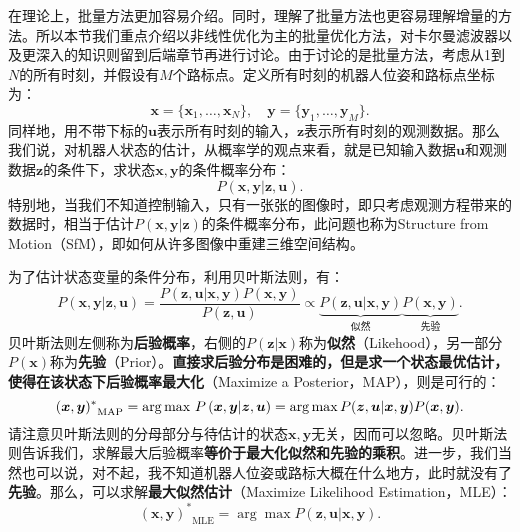 在理论上，批量方法更加容易介绍。同时，理解了批量方法也更容易理解增量的方法。所以本节我们重点介绍以非线性优化为主的批量优化方法，对卡尔曼滤波器以及更深入的知识则留到后端章节再进行讨论。由于讨论的是批量方法，考虑从1到$N$的所有时刻，并假设有$M$个路标点。定义所有时刻的机器人位姿和路标点坐标为：
\[
\bm{x}=\{ \bm{x}_1, \ldots, \bm{x}_N \}, \quad \bm{y} = \{\bm{y}_1, \ldots, \bm{y}_M \}.
\]
同样地，用不带下标的$\bm{u}$表示所有时刻的输入，$\bm{z}$表示所有时刻的观测数据。那么我们说，对机器人状态的估计，从概率学的观点来看，就是已知输入数据$\bm{u}$和观测数据$\bm{z}$的条件下，求状态$\bm{x},\bm{y}$的条件概率分布：
\begin{equation}
P( \bm{x},\bm{y} | \bm{z}, \bm{u}).
\end{equation}
特别地，当我们不知道控制输入，只有一张张的图像时，即只考虑观测方程带来的数据时，相当于估计$P( \bm{x},\bm{y} | \bm{z} )$的条件概率分布，此问题也称为Structure from Motion（SfM），即如何从许多图像中重建三维空间结构\textsuperscript{\cite{Agarwal2009}}。

为了估计状态变量的条件分布，利用贝叶斯法则，有：
\begin{equation}
P\left( { \bm{x},\bm{y}| \bm{z}, \bm{u}} \right) = \frac{{P\left( {\bm{z},\bm{u}|\bm{x},\bm{y}} \right)P\left( \bm{x}, \bm{y} \right)}}{{P\left( \bm{z},\bm{u}\right)}} \propto \underbrace{P\left(  { \bm{z},\bm{u}| \bm{x},\bm{y} } \right)}_{\text{似然}} \underbrace{P\left( \bm{x},\bm{y} \right)}_{\text{先验}}.
\end{equation}
贝叶斯法则左侧称为\textbf{后验概率}，右侧的$P(\bm{z}|\bm{x})$称为\textbf{似然}（Likehood），另一部分$P(\bm{x})$称为\textbf{先验}（Prior）。\textbf{直接求后验分布是困难的，但是求一个状态最优估计，使得在该状态下后验概率最大化}（Maximize a Posterior，MAP），则是可行的：
\begin{equation}
{(\bm{x},\bm{y})^*}_{\mathrm{MAP}} = \arg {\mathop{\rm max}\nolimits}\  P \left( {\bm{x},\bm{y}|\bm{z},\bm{u}} \right) = \arg \max P(\bm{z},\bm{u}|\bm{x},\bm{y})P(\bm{x},\bm{y}).
\end{equation}
请注意贝叶斯法则的分母部分与待估计的状态$\bm{x},\bm{y}$无关，因而可以忽略。贝叶斯法则告诉我们，求解最大后验概率\textbf{等价于最大化似然和先验的乘积}。进一步，我们当然也可以说，对不起，我不知道机器人位姿或路标大概在什么地方，此时就没有了\textbf{先验}。那么，可以求解\textbf{最大似然估计}（Maximize Likelihood Estimation，MLE）：
\begin{equation}
{ (\bm{x},\bm{y})^*}_{\mathrm{MLE}} = \arg \max P( \bm{z},\bm{u}| \bm{x},\bm{y}).
\end{equation}

